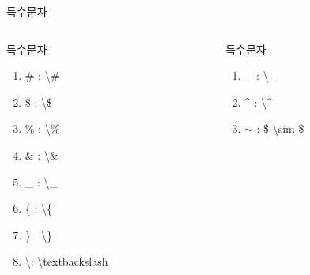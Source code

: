 \documentclass[10pt,xcolor=pdftex,dvipsnames,table,handout]{beamer}
\begin{document}
		\begin{frame}[t,allowframebreaks]{특수문자}

			\begin{columns}[t]
			\begin{column}{.4\textwidth}
			\begin{block} {특수문자}
			\begin{enumerate}
			\item \# : \textbackslash \# \\
			\item \$ : \textbackslash \$ \\
			\item \% : \textbackslash \% \\
			\item \& : \textbackslash \& \\
			\item \_ : \textbackslash \_ \\
			\item \{ : \textbackslash \{ \\
			\item \} : \textbackslash \} \\
			\item \textbackslash  : \textbackslash textbackslash
			\end{enumerate}
			\end{block}
			\end{column}

			\begin{column}{.4\textwidth}
			\begin{block} {특수문자}
			\begin{enumerate}
			\item \_ : \textbackslash \_ \\
			\item \^{} : \textbackslash \^{} \\
			\item $\sim$ : \$ \textbackslash sim \$
			\end{enumerate}
			\end{block}
			\end{column}
			\end{columns}


\end{frame}
\end{document}
